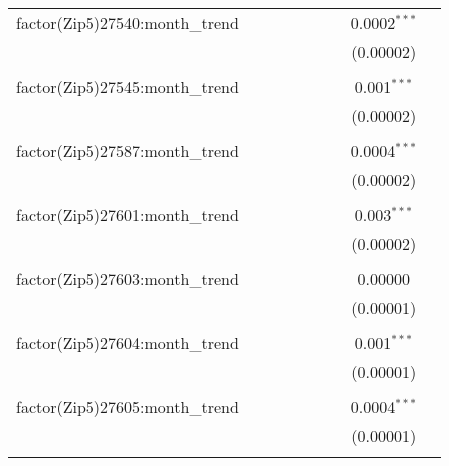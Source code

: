 \begin{table}[H]
{\begin{tabular}{@{\extracolsep{5pt}}lcccccccc}
  factor(Zip5)27540:month\_trend &  &  &  &  &  &  & 0.0002$^{***}$ &  \\  

   &  &  &  &  &  &  & (0.00002) &  \\  

   & & & & & & & & \\  

  factor(Zip5)27545:month\_trend &  &  &  &  &  &  & 0.001$^{***}$ &  \\  

   &  &  &  &  &  &  & (0.00002) &  \\  

   & & & & & & & & \\  

  factor(Zip5)27587:month\_trend &  &  &  &  &  &  & 0.0004$^{***}$ &  \\  

   &  &  &  &  &  &  & (0.00002) &  \\  

   & & & & & & & & \\  

  factor(Zip5)27601:month\_trend &  &  &  &  &  &  & 0.003$^{***}$ &  \\  

   &  &  &  &  &  &  & (0.00002) &  \\  

   & & & & & & & & \\  

  factor(Zip5)27603:month\_trend &  &  &  &  &  &  & 0.00000 &  \\  

   &  &  &  &  &  &  & (0.00001) &  \\  

   & & & & & & & & \\  

  factor(Zip5)27604:month\_trend &  &  &  &  &  &  & 0.001$^{***}$ &  \\  

   &  &  &  &  &  &  & (0.00001) &  \\  

   & & & & & & & & \\  

  factor(Zip5)27605:month\_trend &  &  &  &  &  &  & 0.0004$^{***}$ &  \\  

   &  &  &  &  &  &  & (0.00001) &  \\  

   & & & & & & & & \\  


\end{tabular}}
\end{table}
